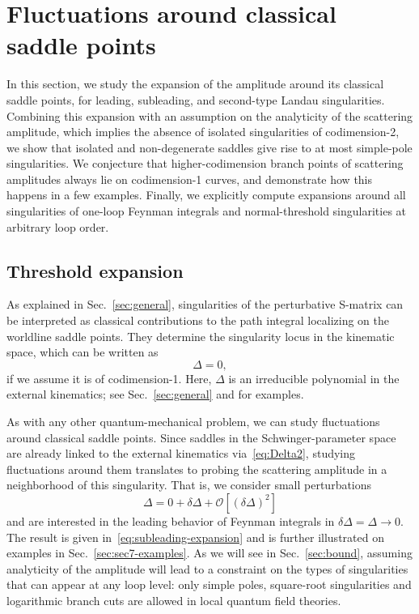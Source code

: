 \documentclass[12pt]{article}
\numberwithin{figure}{section}
\def \be {\begin{equation}}
\def \ee {\end{equation}}
\newcommand{\mc}[1]{\mathcal{#1}}
\begin{document}
	
	
	\newpage
	\section{\label{sec:fluctuations}Fluctuations around classical saddle points}
	
	In this section, we study the expansion of the amplitude around its classical saddle points, for leading, subleading, and second-type Landau singularities. Combining this expansion with an assumption on the analyticity of the scattering amplitude, which implies the absence of isolated singularities of codimension-2, we show that isolated and non-degenerate saddles give rise to at most simple-pole singularities. We conjecture that higher-codimension branch points of scattering amplitudes always lie on codimension-1 curves, and demonstrate how this happens in a few examples. Finally, we explicitly compute expansions around all singularities of one-loop Feynman integrals and normal-threshold singularities at arbitrary loop order.
	
	\subsection{\label{sec:threshold-expansion}Threshold expansion}
	
	As explained in Sec.~\ref{sec:general}, singularities of the perturbative S-matrix can be interpreted as classical contributions to the path integral localizing on the worldline saddle points. They determine the singularity locus in the kinematic space, which can be written as
	\be\label{eq:Delta2}
	\Delta = 0,
	\ee
	if we assume it is of codimension-1. Here, $\Delta$ is an irreducible polynomial in the external kinematics; see Sec.~\ref{sec:general} and \cite{Mizera:2021icv} for examples.
	
	As with any other quantum-mechanical problem, we can study fluctuations around classical saddle points. Since saddles in the Schwinger-parameter space are already linked to the external kinematics via~\eqref{eq:Delta2}, studying fluctuations around them translates to probing the scattering amplitude in a neighborhood of this singularity. That is, we consider small perturbations
	\be\label{eq:deltaDelta}
	\Delta = 0 + \delta \Delta + \mc{O}\! \left[ \left( \delta \Delta\right)^2 \right]
	\ee
	and are interested in the leading behavior of Feynman integrals in $\delta \Delta = \Delta \to 0$. The result is given in~\eqref{eq:subleading-expansion} and is further illustrated on examples in Sec.~\ref{sec:sec7-examples}.
	As we will see in Sec.~\ref{sec:bound}, assuming analyticity of the amplitude will lead to a constraint on the types of singularities that can appear at any loop level: only simple poles, square-root singularities and logarithmic branch cuts are allowed in local quantum field theories.
	
\end{document}
